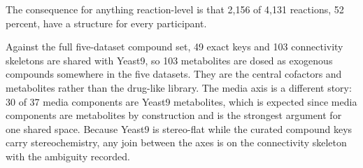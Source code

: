 \begin{table}[htbp]
\centering
\footnotesize
\caption{Yeast9 species by structure class, with how many carry a SMILES.}
\label{tab:yeast9cls}

\end{table}

The consequence for anything reaction-level is that 2{,}156 of 4{,}131 reactions, 52 percent,
have a structure for every participant.

Against the full five-dataset compound set, 49 exact keys and 103 connectivity skeletons are
shared with Yeast9, so 103 metabolites are dosed as exogenous compounds somewhere in the five
datasets. They are the central cofactors and metabolites rather than the drug-like library.
The media axis is a different story: 30 of 37 media components are Yeast9 metabolites, which
is expected since media components are metabolites by construction and is the strongest
argument for one shared space. Because Yeast9 is stereo-flat while the curated compound keys
carry stereochemistry, any join between the axes is on the connectivity skeleton with the
ambiguity recorded.
